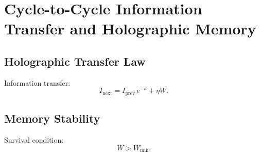 \chapter{Cycle-to-Cycle Information Transfer and Holographic Memory}

\section{Holographic Transfer Law}
Information transfer:
\[
I_{\mathrm{next}} = I_{\mathrm{prev}}\, e^{-\kappa} + \eta W.
\]

\section{Memory Stability}
Survival condition:
\[
W > W_{\mathrm{min}}.
\]
